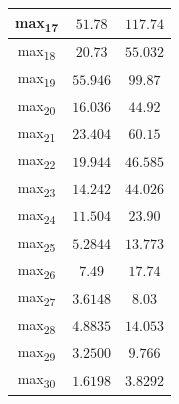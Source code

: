 \documentclass[12pt]{article}
\begin{document}
\begin{table}
\begin{tabular}{||c c c||}
			\hline
			max\textsubscript{17} & $51.78$ & $117.74$ \\
			\hline
			max\textsubscript{18} & $20.73$ & $55.032$ \\
			\hline
			max\textsubscript{19} & $55.946$ & $99.87$ \\
			\hline
			max\textsubscript{20} & $16.036$ & $44.92$ \\
			\hline
			max\textsubscript{21} & $23.404$ & $60.15$ \\
			\hline
			max\textsubscript{22} & $19.944$ & $46.585$ \\
			\hline
			max\textsubscript{23} & $14.242$ & $44.026$ \\
			\hline
			max\textsubscript{24} & $11.504$ & $23.90$ \\
			\hline
			max\textsubscript{25} & $5.2844$ & $13.773$ \\
			\hline
			max\textsubscript{26} & $7.49$ & $17.74$ \\
			\hline
			max\textsubscript{27} & $3.6148$ & $8.03$ \\
			\hline
			max\textsubscript{28} & $4.8835$ & $14.053$ \\
			\hline
			max\textsubscript{29} & $3.2500$ & $9.766$ \\
			\hline
			max\textsubscript{30} & $1.6198$ & $3.8292$ \\
			\hline
		\end{tabular}
	\label{Tab:Features_3_3}
\end{table}
\end{document}
